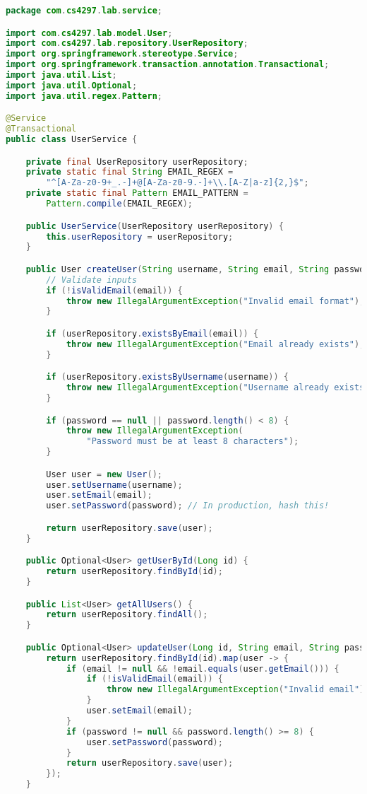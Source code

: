 \documentclass[12pt,a4paper]{article}
\begin{document}
\begin{lstlisting}[language=java, caption=UserService.java - Business Logic Layer]
package com.cs4297.lab.service;

import com.cs4297.lab.model.User;
import com.cs4297.lab.repository.UserRepository;
import org.springframework.stereotype.Service;
import org.springframework.transaction.annotation.Transactional;
import java.util.List;
import java.util.Optional;
import java.util.regex.Pattern;

@Service
@Transactional
public class UserService {

    private final UserRepository userRepository;
    private static final String EMAIL_REGEX =
        "^[A-Za-z0-9+_.-]+@[A-Za-z0-9.-]+\\.[A-Z|a-z]{2,}$";
    private static final Pattern EMAIL_PATTERN =
        Pattern.compile(EMAIL_REGEX);

    public UserService(UserRepository userRepository) {
        this.userRepository = userRepository;
    }

    public User createUser(String username, String email, String password) {
        // Validate inputs
        if (!isValidEmail(email)) {
            throw new IllegalArgumentException("Invalid email format");
        }

        if (userRepository.existsByEmail(email)) {
            throw new IllegalArgumentException("Email already exists");
        }

        if (userRepository.existsByUsername(username)) {
            throw new IllegalArgumentException("Username already exists");
        }

        if (password == null || password.length() < 8) {
            throw new IllegalArgumentException(
                "Password must be at least 8 characters");
        }

        User user = new User();
        user.setUsername(username);
        user.setEmail(email);
        user.setPassword(password); // In production, hash this!

        return userRepository.save(user);
    }

    public Optional<User> getUserById(Long id) {
        return userRepository.findById(id);
    }

    public List<User> getAllUsers() {
        return userRepository.findAll();
    }

    public Optional<User> updateUser(Long id, String email, String password) {
        return userRepository.findById(id).map(user -> {
            if (email != null && !email.equals(user.getEmail())) {
                if (!isValidEmail(email)) {
                    throw new IllegalArgumentException("Invalid email");
                }
                user.setEmail(email);
            }
            if (password != null && password.length() >= 8) {
                user.setPassword(password);
            }
            return userRepository.save(user);
        });
    }


\end{lstlisting}
\end{document}
